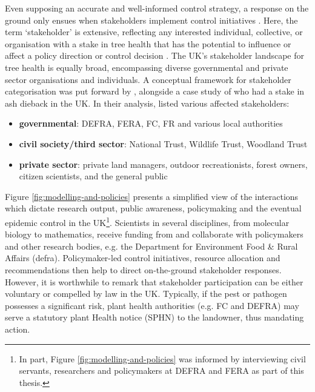 Even supposing an accurate and well-informed control strategy,
a response on the ground only ensues when stakeholders implement control initiatives \cite{reed2018theory}. Here, the term `stakeholder' is extensive, reflecting any interested individual, collective, or organisation with a stake in tree health that has the potential to influence or affect a policy direction or control decision \cite{brugha2000stakeholder}. The UK's stakeholder landscape for tree health is equally broad, encompassing diverse governmental and private sector organisations and individuals. A conceptual framework for stakeholder categorisation was put forward by \cite{dandy2017has}, alongside a case study of who had a stake in ash dieback in the UK. In their analysis, \cite{dandy2017has} listed various affected stakeholders:
\begin{itemize}
    \item \textbf{governmental}: DEFRA, FERA, FC, FR and various local authorities
    \item \textbf{civil society/third sector}: National Trust, Wildlife Trust, Woodland Trust
    \item \textbf{private sector}: private land managers, outdoor recreationists, forest owners, citizen scientists, and the general public
\end{itemize}


Figure \ref{fig:modelling-and-policies} presents a simplified view of the interactions which dictate research output, public awareness, 
policymaking and the eventual epidemic control in the UK\footnote{
In part, Figure \ref{fig:modelling-and-policies} was informed by interviewing civil servants, researchers and policymakers at DEFRA and FERA as part of this thesis.}. Scientists in several disciplines,
from molecular biology to mathematics, receive funding from and collaborate with policymakers and other research bodies, e.g. the Department for Environment Food \& Rural Affairs (\acrshort{defra}). Policymaker-led control initiatives, resource allocation and recommendations then help to direct on-the-ground stakeholder
responses. However, it is worthwhile to remark that stakeholder participation can be either voluntary or compelled by law in the UK. Typically, if the pest or pathogen possesses a significant risk, plant health authorities (e.g. FC and DEFRA) may serve a statutory plant Health notice (SPHN) to the landowner, thus mandating action.

